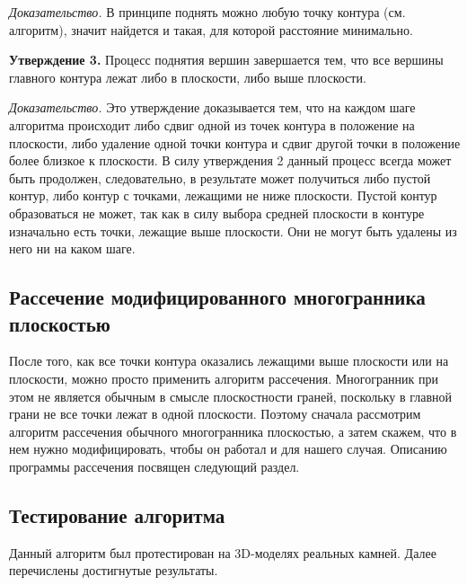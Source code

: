 \documentclass[a4paper,12pt, titlepage]{article}
\begin{document}
\begin{flushleft}
 \textit{Доказательство.} В принципе поднять можно любую точку контура (см. алгоритм), значит найдется
 и такая, для которой расстояние минимально.
\end{flushleft}

\begin{flushleft}
 \textbf{Утверждение 3.} Процесс поднятия вершин завершается тем, что все вершины главного контура лежат
либо в плоскости, либо выше плоскости.
\end{flushleft}

\begin{flushleft}
 \textit{Доказательство.} Это утверждение доказывается тем, что на каждом шаге алгоритма происходит либо 
сдвиг одной из точек контура в положение на плоскости, либо удаление одной точки контура и сдвиг другой точки
в положение более близкое к плоскости. В силу утверждения 2 данный процесс всегда может быть продолжен,
следовательно, в результате может получиться либо пустой контур, либо контур с точками, лежащими не ниже
плоскости. Пустой контур образоваться не может, так как в силу выбора средней плоскости в контуре изначально есть
точки, лежащие выше плоскости. Они не могут быть удалены из него ни на каком шаге.
\end{flushleft}


\subsection{Рассечение модифицированного многогранника плоскостью}
\begin{flushleft}
 После того, как все точки контура оказались лежащими выше плоскости или на плоскости, можно просто 
применить алгоритм рассечения. Многогранник при этом не является обычным в смысле плоскостности граней,
поскольку в главной грани не все точки лежат в одной плоскости. Поэтому сначала рассмотрим алгоритм
рассечения обычного многогранника плоскостью, а затем скажем, что в нем нужно модифицировать, чтобы он 
работал и для нашего случая. Описанию программы рассечения посвящен следующий раздел.
\end{flushleft}

\newpage
\subsection{Тестирование алгоритма}
\begin{flushleft}
 Данный алгоритм был протестирован на 3D-моделях реальных камней. Далее перечислены 
достигнутые результаты.
\end{flushleft}
\end{document}
